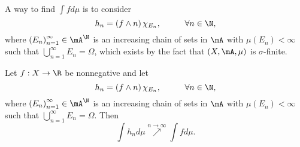 \documentclass[stat901]{subfiles}
\begin{document}
    \np A way to find $\int fd\mu$ is to consider
    \begin{equation*}
        h_n = \left( f\wedge n \right) \chi_{E_n}, \hspace{1cm}\forall n\in\N,
    \end{equation*}
    where $\left( E_{n} \right)^{\infty}_{n=1}\in\mA^{\N}$ is an increasing chain of sets in $\mA$ with $\mu\left( E_n \right)<\infty$ such that $\bigcup^{\infty}_{n=1} E_n = \Omega$, which exists by the fact that $\left( X,\mA,\mu \right)$ is $\sigma$-finite.

    \begin{lemma}{}
        Let $f:X\to\R$ be nonnegative and let
        \begin{equation*}
            h_n = \left( f\wedge n \right) \chi_{E_n}, \hspace{1cm}\forall n\in\N,
        \end{equation*}
        where $\left( E_{n} \right)^{\infty}_{n=1}\in\mA^{\N}$ is an increasing chain of sets in $\mA$ with $\mu\left( E_n \right)<\infty$ such that $\bigcup^{\infty}_{n=1} E_n = \Omega$. Then
        \begin{equation*}
            \int h_nd\mu \overset{n\to\infty}{\nearrow} \int fd\mu.
        \end{equation*}
    \end{lemma}
\end{document}
